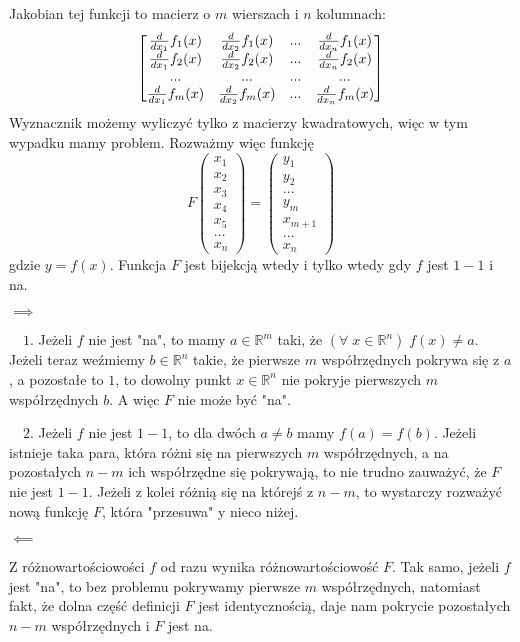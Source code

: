 \documentclass{article}[13pt]
\newcommand{\R}{\mathds{R}}
\begin{document}
Jakobian tej funkcji to macierz o $m$ wierszach i $n$ kolumnach:
$$
\begin{bmatrix}
    {d\over dx_1}f_1(x) & {d\over dx_2}f_1(x)&...&{d\over dx_n}f_1(x)\\
    {d\over dx_1}f_2(x) & {d\over dx_2}f_2(x)&...&{d\over dx_n}f_2(x)\\
    ... & ... & ... & ...\\
    {d\over dx_1}f_m(x) & {d\over dx_2}f_m(x)&...&{d\over dx_n}f_m(x)\\
\end{bmatrix}
$$
Wyznacznik możemy wyliczyć tylko z macierzy kwadratowych, więc w tym wypadku mamy problem. Rozważmy więc funkcję
$$F\begin{pmatrix}
    x_1\\x_2\\x_3\\x_4\\x_5\\...\\x_n
\end{pmatrix}=\begin{pmatrix}
    y_1\\y_2\\...\\y_m\\x_{m+1}\\...\\x_{n}
\end{pmatrix}$$
gdzie $y=f(x)$. Funkcja $F$ jest bijekcją wtedy i tylko wtedy gdy $f$ jest $1-1$ i na.
\smallskip

$\implies$

$\quad 1.$ Jeżeli $f$ nie jest "na", to mamy $a\in\R^m$ taki, że $(\forall\;x\in\R^n)\;f(x)\neq a$. Jeżeli teraz weźmiemy $b\in\R^n$ takie, że pierwsze $m$ współrzędnych pokrywa się z $a$, a pozostałe to $1$, to dowolny punkt $x\in\R^n$ nie pokryje pierwszych $m$ współrzędnych $b$. A więc $F$ nie może być "na".

$\quad 2.$ Jeżeli $f$ nie jest $1-1$, to dla dwóch $a \neq b$ mamy $f(a)=f(b)$. Jeżeli istnieje taka para, która różni się na pierwszych $m$ współrzędnych, a na pozostałych $n-m$ ich współrzędne się pokrywają, to nie trudno zauważyć, że $F$ nie jest $1-1$. Jeżeli z kolei różnią się na którejś z $n-m$, to wystarczy rozważyć nową funkcję $F$, która "przesuwa" y nieco niżej.
\medskip

$\impliedby$

Z różnowartościowości $f$ od razu wynika różnowartościowość $F$. Tak samo, jeżeli $f$ jest "na", to bez problemu pokrywamy pierwsze $m$ współrzędnych, natomiast fakt, że dolna część definicji $F$ jest identycznością, daje nam pokrycie pozostałych $n-m$ współrzędnych i $F$ jest na.
\medskip
\end{document}
